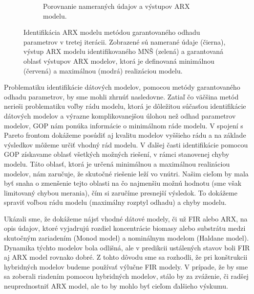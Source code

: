 \begin{figure}
\begin{subfigure}[b]{0.49\textwidth}
		\caption{Porovnanie nameraných údajov a výstupov ARX modelu.}
		\label{fig:ARX_sub_ident}
	\end{subfigure}
\caption{Identifikácia ARX modelu metódou garantovaného odhadu parametrov v tretej iterácii. Zobrazené sú namerané údaje (čierna), výstup ARX modelu identifikovaného MNŠ (zelená) a garantovaná oblasť výstupov ARX modelov, ktorá je definovaná minimálnou (červená) a maximálnou (modrá) realizáciou modelu.}
\label{fig:ARX_sub_identification}
\end{figure}

Problematiku identifikácie dátových modelov, pomocou metódy garantovaného odhadu parametrov, by sme mohli zhrnúť nasledovne. Zatiaľ čo väčšina metód nerieši problematiku voľby rádu modelu, ktorá je dôležitou súčasťou identifikácie dátových modelov a výrazne komplikovanejšou úlohou než odhad parametrov modelov, GOP nám ponúka informácie o minimálnom ráde modelu. V spojení s Pareto frontom dokážeme posúdiť aj kvalitu modelov vyššieho rádu a na základe výsledkov môžeme určiť vhodný rád modelu. V ďalšej časti identifikácie pomocou GOP získavame oblasť všetkých možných riešení, v rámci stanovenej chyby modelu. Táto oblasť, ktorá je určená minimálnou a maximálnou realizáciou modelov, nám zaručuje, že skutočné riešenie leží vo vnútri. Našim cieľom by mala byť snaha o zmenšenie tejto oblasti na čo najmenšiu možnú hodnotu (sme však limitovaný chybou merania), čím si zaručíme presnejší výsledok. To dokážeme spraviť voľbou rádu modelu (maximálny rozptyl odhadu) a chyby modelu.

Ukázali sme, že dokážeme nájsť vhodné dátové modely, či už FIR alebo ARX, na opis údajov, ktoré vyjadrujú rozdiel koncentrácie biomasy alebo substrátu medzi skutočným zariadením (Monod model) a nominálnym modelom (Haldane model). Dynamika týchto modelov bola odlišná, ale v predikcii ustálených stavov boli FIR aj ARX model rovnako dobré. Z tohto dôvodu sme sa rozhodli, že pri konštrukcii hybridných modelov budeme používať výlučne FIR modely. V prípade, že by sme sa zoberali riadením pomocou hybridných modelov, stálo by za zváženie, či radšej neuprednostniť ARX model, ale to by mohlo byť cieľom ďalšieho výskumu.